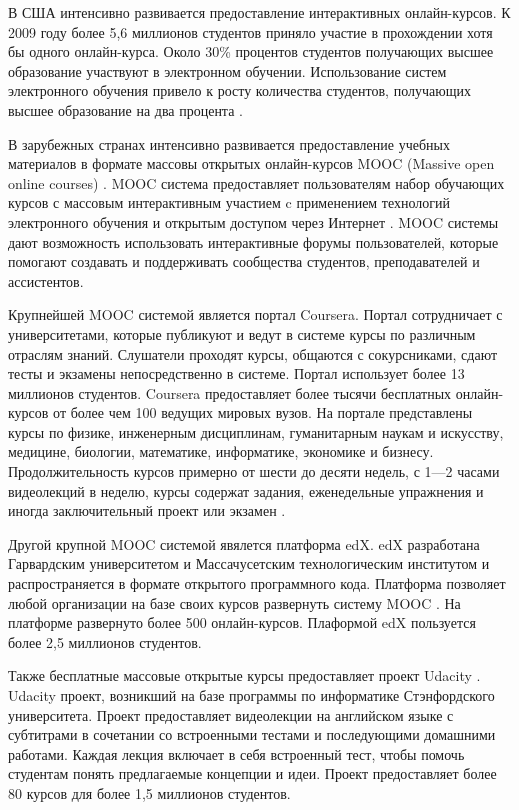 В США интенсивно развивается предоставление интерактивных онлайн-курсов. К 2009 году более 5,6 миллионов студентов приняло участие в прохождении хотя бы одного онлайн-курса. Около 30\% процентов студентов получающих высшее образование участвуют в электронном обучении. Использование систем электронного обучения привело к росту количества студентов, получающих высшее образование на два процента \cite{allen2010class}.

В зарубежных странах интенсивно развивается предоставление учебных материалов в формате массовы открытых онлайн-курсов MOOC (Massive open online courses) \cite{pappano2012year}. MOOC система предоставляет пользователям набор обучающих курсов с массовым интерактивным участием c применением технологий электронного обучения и открытым доступом через Интернет \cite{mcauley2010mooc}. MOOC системы дают возможность использовать интерактивные форумы пользователей, которые помогают создавать и поддерживать сообщества студентов, преподавателей и ассистентов.

Крупнейшей MOOC системой является портал Coursera. Портал сотрудничает с университетами, которые публикуют и ведут в системе курсы по различным отраслям знаний. Слушатели проходят курсы, общаются с сокурсниками, сдают тесты и экзамены непосредственно в системе. Портал использует более 13 миллионов студентов. Coursera предоставляет более тысячи бесплатных онлайн-курсов от более чем 100 ведущих мировых вузов. На портале представлены курсы по физике, инженерным дисциплинам, гуманитарным наукам и искусству, медицине, биологии, математике, информатике, экономике и бизнесу. Продолжительность курсов примерно от шести до десяти недель, с 1—2 часами видеолекций в неделю, курсы содержат задания, еженедельные упражнения и иногда заключительный проект или экзамен \cite{knox2012mooc}.

Другой крупной MOOC системой явялется платформа edX. edX разработана Гарвардским университетом и Массачусетским технологическим институтом и распространяется в формате открытого программного кода. Платформа позволяет любой организации на базе своих курсов развернуть систему MOOC \cite{breslow2013studying}. На платформе развернуто более 500 онлайн-курсов. Плаформой edX пользуется более 2,5 миллионов студентов. 

Также бесплатные массовые открытые курсы предоставляет проект Udacity \cite{salmon2012udacity}. Udacity проект, возникший на базе программы по информатике Стэнфордского университета. Проект предоставляет видеолекции на английском языке с субтитрами в сочетании со встроенными тестами и последующими домашними работами. Каждая лекция включает в себя встроенный тест, чтобы помочь студентам понять предлагаемые концепции и идеи. Проект предоставляет более 80 курсов для более 1,5 миллионов студентов.

